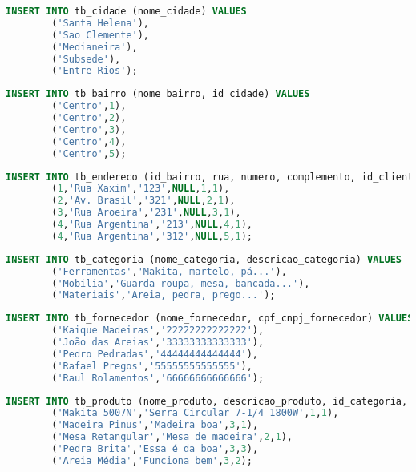 \documentclass[
12pt,
a4paper,
semrecuonosumario,
sumario = abnt-6027-2012]{report}
\begin{document}
    \begin{lstlisting}[language=SQL,caption={DML -- Tabela \texttt{tb\_cidade}}]
        INSERT INTO tb_cidade (nome_cidade) VALUES
        ('Santa Helena'),
        ('Sao Clemente'),
        ('Medianeira'),
        ('Subsede'),
        ('Entre Rios');
    \end{lstlisting}
    
    \begin{lstlisting}[language=SQL,caption={DML -- Tabela \texttt{tb\_bairro}}]
        INSERT INTO tb_bairro (nome_bairro, id_cidade) VALUES
        ('Centro',1),
        ('Centro',2),
        ('Centro',3),
        ('Centro',4),
        ('Centro',5);
    \end{lstlisting}
    
    \begin{lstlisting}[language=SQL,caption={DML -- Tabela \texttt{tb\_endereco}}]
        INSERT INTO tb_endereco (id_bairro, rua, numero, complemento, id_cliente, prioridade) VALUES
        (1,'Rua Xaxim','123',NULL,1,1),
        (2,'Av. Brasil','321',NULL,2,1),
        (3,'Rua Aroeira','231',NULL,3,1),
        (4,'Rua Argentina','213',NULL,4,1),
        (4,'Rua Argentina','312',NULL,5,1);
    \end{lstlisting}
    
    \begin{lstlisting}[language=SQL,caption={DML -- Tabela \texttt{tb\_categoria}}]
        INSERT INTO tb_categoria (nome_categoria, descricao_categoria) VALUES
        ('Ferramentas','Makita, martelo, pá...'),
        ('Mobilia','Guarda-roupa, mesa, bancada...'),
        ('Materiais','Areia, pedra, prego...');
    \end{lstlisting}
    
    \begin{lstlisting}[language=SQL,caption={DML -- Tabela \texttt{tb\_fornecedor}}]
        INSERT INTO tb_fornecedor (nome_fornecedor, cpf_cnpj_fornecedor) VALUES
        ('Kaique Madeiras','22222222222222'),
        ('João das Areias','33333333333333'),
        ('Pedro Pedradas','44444444444444'),
        ('Rafael Pregos','55555555555555'),
        ('Raul Rolamentos','66666666666666');
    \end{lstlisting}
    
    \begin{lstlisting}[language=SQL,caption={DML -- Tabela \texttt{tb\_produto}}]
        INSERT INTO tb_produto (nome_produto, descricao_produto, id_categoria, id_fornecedor) VALUES
        ('Makita 5007N','Serra Circular 7-1/4 1800W',1,1),
        ('Madeira Pinus','Madeira boa',3,1),
        ('Mesa Retangular','Mesa de madeira',2,1),
        ('Pedra Brita','Essa é da boa',3,3),
        ('Areia Média','Funciona bem',3,2);
    \end{lstlisting}
    
\end{document}
